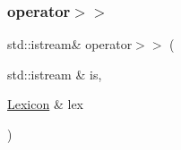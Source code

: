 \mbox{\label{classLexicon_a1f966ac4d3b3849aa4bc556d995c24ba}} 
\subsubsection{\texorpdfstring{operator$>$$>$}{operator>>}}
{\footnotesize\ttfamily std\+::istream\& operator$>$$>$ (\begin{DoxyParamCaption}\item[{std\+::istream \&}]{is,  }\item[{\mbox{\hyperlink{classLexicon}{Lexicon}} \&}]{lex }\end{DoxyParamCaption})\hspace{0.3cm}{\ttfamily [friend]}}

